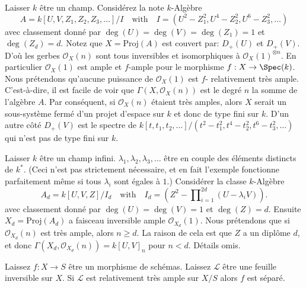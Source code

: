 \begin{example}

\label{example-not-finite-type-proj}

Laisser $k$ être un champ. Considérez la note $k$-Algèbre
$$
A = k[U, V, Z_1, Z_2, Z_3, \ldots]/I
\quad
\text{with}
\quad
I = (U^2 - Z_1^2, U^4 - Z_2^2, U^6 - Z_3^2, \ldots)
$$
avec classement donné par $\deg(U) = \deg(V) = \deg(Z_1) = 1$
et $\deg(Z_d) = d$. Notez que $X = \text{Proj}(A)$ est couvert par: $D_{+}(U)$ et
$D_{+}(V)$. D'où les gerbes $\mathcal{O}_X(n)$ sont tous inversibles et isomorphiques à $\mathcal{O}_X(1)^{\otimes n}$. En particulier $\mathcal{O}_X(1)$ est ample et $f$-ample pour le morphisme $f : X \to \Spec(k)$. Nous prétendons qu'aucune puissance de $\mathcal{O}_X(1)$ est $f$- relativement très ample. C'est-à-dire, il est facile de voir que $\Gamma(X, \mathcal{O}_X(n))$
est le degré $n$ la somme de l'algèbre $A$. Par conséquent, si $\mathcal{O}_X(n)$
étaient très amples, alors $X$ serait un sous-système fermé d'un projet d'espace sur $k$ et donc de type fini sur $k$. D'un autre côté
$D_{+}(V)$ est le spectre de
$k[t, t_1, t_2, \ldots]/(t^2 - t_1^2, t^4 - t_2^2, t^6 - t_3^2, \ldots)$
qui n'est pas de type fini sur $k$.

\end{example}

\begin{example}

\label{example-not-bounded}

Laisser $k$ être un champ infini. $\lambda_1, \lambda_2, \lambda_3, \ldots$
être en couple des éléments distincts de $k^*$. (Ceci n'est pas strictement nécessaire, et en fait l'exemple fonctionne parfaitement même si tous $\lambda_i$
sont égales à $1$.) Considérer la classe $k$-Algèbre
$$
A_d = k[U, V, Z]/I_d
\quad
\text{with}
\quad
I_d = (Z^2 - \prod\nolimits_{i = 1}^{2d} (U - \lambda_i V)).
$$
avec classement donné par $\deg(U) = \deg(V) = 1$ et $\deg(Z) = d$. Ensuite $X_d = \text{Proj}(A_d)$ a faisceau inversible ample
$\mathcal{O}_{X_d}(1)$. Nous prétendons que si $\mathcal{O}_{X_d}(n)$
est très ample, alors $n \geq d$. La raison de cela est que $Z$
a un diplôme $d$, et donc $\Gamma(X_d, \mathcal{O}_{X_d}(n)) =
k[U, V]_n$ pour $n < d$. Détails omis.

\end{example}

\begin{lemma}

\label{lemma-relatively-very-ample-separated}
Laissez $f : X \to S$ être un morphisme de schémas. Laissez $\mathcal{L}$ être une feuille inversible sur $X$. Si $\mathcal{L}$ est relativement très ample sur $X/S$ alors $f$ est séparé.
\end{lemma}

